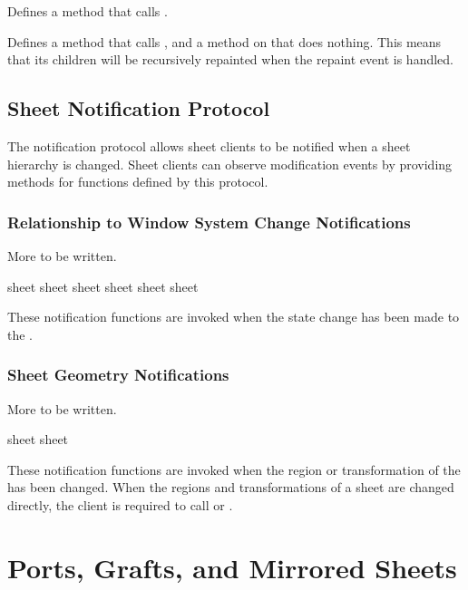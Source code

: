 Defines a  method that calls .


Defines a  method that calls , and a
method on  that does nothing.  This means that its children
will be recursively repainted when the repaint event is handled.


\section {Sheet Notification Protocol}

The notification protocol allows sheet clients to be notified when a sheet
hierarchy is changed.  Sheet clients can observe modification events by
providing  methods for functions defined by this protocol.

\subsection {Relationship to Window System Change Notifications}

 {More to be written.}

   {sheet}
 {sheet}
   {sheet}
  {sheet}
   {sheet}
  {sheet}

These notification functions are invoked when the state change has been made to
the  .


\subsection {Sheet Geometry Notifications}

 {More to be written.}

 {sheet}
 {sheet}

These notification functions are invoked when the region or transformation of
the   has been changed.  When the regions and
transformations of a sheet are changed directly, the client is required to call
 or .


\chapter {Ports, Grafts, and Mirrored Sheets}
\label{ports-and-grafts}

